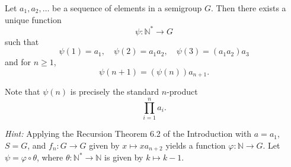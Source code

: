 \begin{exercise}
Let $a_1, a_2, \dots$ be a sequence of elements in a semigroup $G$. Then there exists a unique function 
\[
\psi : \mathbb{N}^\ast \to G
\] 
such that 
\[
\psi(1) = a_1, \quad \psi(2) = a_1 a_2, \quad \psi(3) = (a_1 a_2) a_3
\] 
and for $n \ge 1$,
\[
\psi(n+1) = (\psi(n)) a_{n+1}.
\]

Note that $\psi(n)$ is precisely the standard $n$-product 
\[
\prod_{i=1}^{n} a_i.
\]

\textit{Hint:} Applying the Recursion Theorem 6.2 of the Introduction with $a = a_1$, $S = G$, and $f_n : G \to G$ given by $x \mapsto x a_{n+2}$ yields a function $\varphi : \mathbb{N} \to G$. Let $\psi = \varphi \circ \theta$, where $\theta : \mathbb{N}^\ast \to \mathbb{N}$ is given by $k \mapsto k-1$.
\end{exercise}